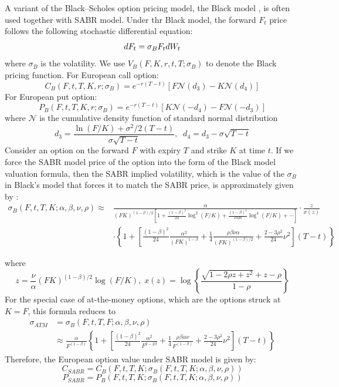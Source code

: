 \documentclass[letterpaper,12pt,titlepage,oneside,final]{book}
\numberwithin{equation}{section}
\theoremstyle{definition}
\begin{document}
A variant of the Black–Scholes option pricing model, the Black model \cite{black1976pricing}, is often used together with SABR model. Under thr Black model, the  forward $F_t$ price follows the following stochastic differential equation:
\[
dF_t=\sigma_B F_t dW_t\\
\]
where $\sigma_B$ is the volatility. We use $V_B(F,K,r,t,T;\sigma_{B})$ to denote the Black pricing function. For European call option:
\[
C_B(F,t,T,K,r;\sigma_{B})=e^{-r(T-t)}[F \mathcal{N} (d_3)-K  \mathcal{N} (d_4)]
\]
For European put option:
\[
P_B(F,t,T,K,r;\sigma_{B})=e^{-r(T-t)}[K  \mathcal{N} (-d_4)-F  \mathcal{N} (-d_3)]
\]
where $\mathcal{N}$ is the cumulative density function of standard normal distribution
\[
d_3=\frac{\ln(F/K)+\sigma^2/2(T-t)}{\sigma \sqrt{T-t}}, \;\; d_4=d_3-\sigma  \sqrt{T-t}
\]
Consider an option on the forward $F$ with expiry $T$ and strike $K$ at time $t$.
If we force the SABR model price of the option into the form of the Black model valuation formula, then the SABR implied volatility, which is the value of the $\sigma_B$ in Black's model that forces it to match the SABR price, is approximately given by \cite{hagan2002managing,bartlett2006hedging}:
\begin{equation}
\begin{split}
	\sigma_{B}(F,t,T,K;\alpha,\beta,\nu,\rho) \approx&
	\frac{\alpha}{(FK)^{(1-\beta)/2}\left[1+\frac{(1-\beta)^2}{24}\log^2(F/K)
		+ \frac{(1-\beta)^4}{1920}\log^4(F/K) + \cdots\right]} \cdot
	\frac{z}{x(z)}  \\
	&  \cdot \left\{1+\left[\frac{(1-\beta)^2}{24}\frac{\alpha^2}{(FK)^{1-\beta}}
	+ \frac{1}{4} \frac{\rho\beta\nu\alpha}{(FK)^{(1-\beta)/2}} +
	\frac{2-3\rho^2}{24}\nu^2 \right](T-t)\right\}
\end{split}
\label{eq:SABRExpansion}
\end{equation}

where
\[
z = \frac{\nu}{\alpha}(FK)^{(1-\beta)/2}\log (F/K),\; x(z) =
\log\left\{\frac{\sqrt{1-2\rho z + z^2}+z-\rho}{1-\rho}\right\}
\]
For the special case of at-the-money options, which are the options struck at $K=F$,
this formula reduces to
\[
\begin{split}
\sigma_{ATM} &= \sigma_{B}(F,t,T,F;\alpha,\beta,\nu,\rho) \\
&\approx
\frac{\alpha}{F^{(1-\beta)}}\left\{1 +
\left[\frac{(1-\beta)^2}{24}\frac{\alpha^2}{F^{2-2\beta}} +
\frac{1}{4}\frac{\rho\beta\alpha\nu}{F^{(1-\beta)}} +
\frac{2-3\rho^2}{24}\nu^2 \right] (T-t) \right\}
\end{split}
\]
Therefore, the European option value under SABR model is given by:
\[
C_{SABR}=C_B(F,t,T,K;\sigma_{B}(F,t,T,K;\alpha,\beta,\nu,\rho))
\]
\[
P_{SABR}=P_B(F,t,T,K;\sigma_{B}(F,t,T,K;\alpha,\beta,\nu,\rho))
\]
\end{document}
